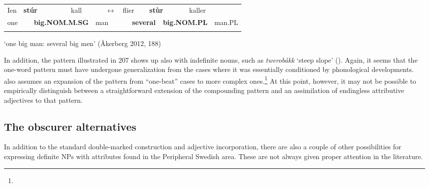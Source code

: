 \begin{tabular}{llllllllllllll}
\lsptoprule
Ien & \multicolumn{2}{l}{{\bfseries stúr}

} & \multicolumn{2}{l}{kall 

} & \multicolumn{2}{l}{{\bfseries $\leftrightarrow $}

} & \multicolumn{2}{l}{flier

} & \multicolumn{2}{l}{{\bfseries stùr}

} & \multicolumn{2}{l}{kaller

} & \\
\multicolumn{2}{l}{one

} & \multicolumn{2}{l}{{\bfseries big.NOM.M.SG}

} & \multicolumn{2}{l}{man

} & \multicolumn{2}{l}{} & \multicolumn{2}{l}{{\bfseries several}

} & \multicolumn{2}{l}{{\bfseries big.NOM.PL}

} & \multicolumn{2}{l}{man.PL

}\\
\lspbottomrule
\end{tabular}

\begin{styleTranslation}
‘one big man: several big men’ (Åkerberg 2012, 188)

\end{styleTranslation}

\begin{styleBodyTextFirst}
In addition, the pattern illustrated in 207 shows up also with indefinite nouns, such as \textit{twerobåkk} ‘steep slope’ (\citet[52]{Levander1909}). Again, it seems that the one-word pattern must have undergone generalization from the cases where it was essentially conditioned by phonological developments. \citet[103]{Dahlstedt1962} also assumes an expansion of the pattern from “one-beat” cases to more complex ones.\footnote{} At this point, however, it may not be possible to empirically distinguish between a straightforward extension of the compounding pattern and an assimilation of endingless attributive adjectives to that pattern. 

\end{styleBodyTextFirst}

\subsection{\rmfamily The obscurer alternatives}
\label{bkm:Ref105224927}
\begin{styleBodyTextFirst}
In addition to the standard double-marked construction and adjective incorporation, there are also a couple of other possibilities for expressing definite NPs with attributes found in the Peripheral Swedish area. These are not always given proper attention in the literature. 

\end{styleBodyTextFirst}

